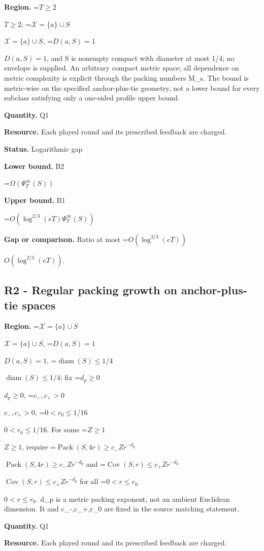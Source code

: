 \documentclass[10pt,a4paper]{article}
\newcommand{\AtlasMath}[1]{\par\begingroup\centering\setbox0=\hbox{$\displaystyle #1$}\ifdim\wd0>1.4\linewidth\typeout{ATLAS WIDE FORMULA: \the\wd0}\fi\ifdim\wd0>\linewidth\resizebox{\linewidth}{!}{\box0}\else\box0\fi\par\endgroup}
\newcommand{\AtlasInlineMath}[1]{\begingroup\setbox0=\hbox{$#1$}\ifdim\wd0>.4\linewidth\endgroup\AtlasMath{#1}\else\endgroup$#1$\fi}
\begin{document}
\textbf{Region.} \AtlasInlineMath{T\ge2}; \AtlasInlineMath{\mathcal X=\{a\}\cup S}, \AtlasInlineMath{D(a,S)=1}, and S is nonempty compact with diameter at most 1/4; no envelope is supplied. An arbitrary compact metric space; all dependence on metric complexity is explicit through the packing numbers M\_s. The bound is metric-wise on the specified anchor-plus-tie geometry, not a lower bound for every subclass satisfying only a one-sided profile upper bound.



\textbf{Quantity.} Q1



\textbf{Resource.} Each played round and its prescribed feedback are charged.



\textbf{Status.} Logarithmic gap



\textbf{Lower bound.} B2



\AtlasMath{\Omega(\Psi_T^\infty(S))}


\textbf{Upper bound.} B1



\AtlasMath{O(\log^{2/3}(eT)\Psi_T^\infty(S))}


\textbf{Gap or comparison.} Ratio at most \AtlasInlineMath{O(\log^{2/3}(eT))}.



\subsection{R2 - Regular packing growth on anchor-plus-tie spaces}


\textbf{Region.} \AtlasInlineMath{\mathcal X=\{a\}\cup S}, \AtlasInlineMath{D(a,S)=1}, \AtlasInlineMath{\operatorname{diam}(S)\le1/4}; fix \AtlasInlineMath{d_p\ge0}, \AtlasInlineMath{c_-,c_+>0}, \AtlasInlineMath{0<r_0\le1/16}. For some \AtlasInlineMath{Z\ge1}, require \AtlasInlineMath{\operatorname{Pack}(S,4r)\ge c_-Zr^{-d_p}} and \AtlasInlineMath{\operatorname{Cov}(S,r)\le c_+Zr^{-d_p}} for all \AtlasInlineMath{0<r\le r_0}. d\_p is a metric packing exponent, not an ambient Euclidean dimension. It and c\_-,c\_+,r\_0 are fixed in the source matching statement.



\textbf{Quantity.} Q1



\textbf{Resource.} Each played round and its prescribed feedback are charged.
\end{document}
